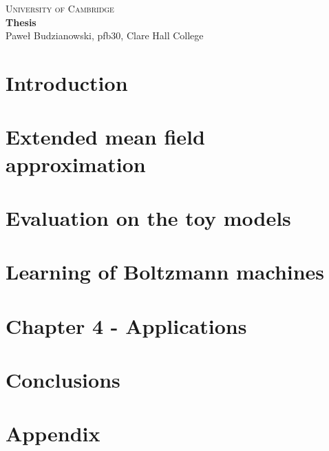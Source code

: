 \documentclass[a4paper]{article}
\begin{document}
\begin{center}
\Large{\textsc{
University of Cambridge}}\\
\vspace{.5cm}
\large\textbf{Thesis}\\
\vspace{.5cm}
\large{Paweł Budzianowski, pfb30, Clare Hall College}\\
\end{center} 

\tableofcontents

\newpage
\section{Introduction}
%

\newpage
\section{Extended mean field approximation}


\newpage
\section{Evaluation on the toy models}
%

\newpage
\section{Learning of Boltzmann machines}


\newpage
\section{Chapter 4 - Applications}
%

\newpage
\section{Conclusions}
%




\newpage
\section{Appendix}
%



%
%



\end{document}
